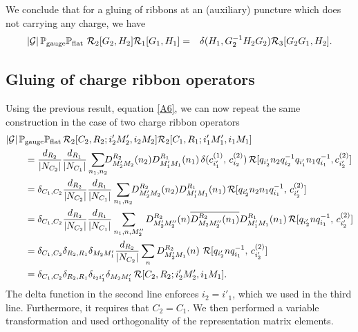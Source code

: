 \documentclass[nofootinbib,superscriptaddress,eqsecnum,tightenlines,11pt]{revtex4-1}
\def\nn{\nonumber}
\def\q{\qquad}
\def\mG{\mathcal{G}}
\def\ba{\begin{eqnarray}}
\def\ea{\end{eqnarray}}
\begin{document}
We conclude that for a gluing of ribbons at an (auxiliary) puncture which does not carrying any charge, we have
\ba\label{A6}
|\mG|\,  {\mathbb P}_\text{gauge}  {\mathbb P}_\text{flat} \,\, {\cal R}_2[G_2,H_2]  {\cal R}_1[G_1,H_1] 
&=& 
\delta(H_1,G_2^{-1} H_2 G_2)  {\cal R}_3[G_2 G_1,H_2]   .
\ea


\subsection{Gluing of charge ribbon operators}\label{GCR}


Using the previous result, equation \eqref{A6}, we can now repeat the same construction in the case of two charge ribbon operators
\begin{align}
	& |{\cal G}|\,{\mathbb P}_\text{gauge} {\mathbb P}_\text{flat} \, {\cal R}_2[C_2,R_2; i'_2M'_2,i_2M_2]   {\cal R}_2[C_1,R_1; i'_1M'_1,i_1M_1]\nn\\
	&\q =  \frac{d_{R_2}}{|N_{C_2}|} \frac{d_{R_1}}{|N_{C_1}|}
	\sum_{n_1,n_2}\!\!\!
	D^{R_2}_{M'_2M_2}(n_2) D^{R_1}_{M_1'M_1}(n_1) \, \delta( c^{(1)}_{i'_1} ,\,c^{(2)}_{i_2}  )\, %
	 {\cal R}[ q_{i'_2}n_2 q^{-1}_{i_2} q_{i'_1} n_1 q^{-1}_{i_1},c^{(2)}_{i'_2}]
	\nn\\
	&\q =
	\delta_{C_1,C_2}\frac{d_{R_2}}{|N_{C_2}|} \frac{d_{R_1}}{|N_{C_1}|} \sum_{n_1,n_2}\!\!
	D^{R_2}_{M'_2M_2}(n_2) D^{R_1}_{M_1'M_1}(n_1) \,
	 {\cal R}[ q_{i'_2}n_2  n_1 q^{-1}_{i_1},\, c^{(2)}_{i'_2}] \nn\\
	 &\q =
	\delta_{C_1,C_2} \frac{d_{R_2}}{|N_{C_2}|} \frac{d_{R_1}}{|N_{C_1}|}
	\sum_{n_1,n,M_2''}
	D^{R_2}_{M'_2M_2''}(n)  \overline{D^{R_2}_{M_2M''_2}(n_1)} D^{R_1}_{M_1'M_1}(n_1) \,
 	{\cal R}[ q_{i'_2}n q^{-1}_{i_1},\, c^{(2)}_{i'_2}]  \nn\\
 	&\q =\delta_{C_1,C_2}  \delta_{R_2,R_1}   \delta_{M_2 M_1'} \frac{d_{R_2}}{|N_{C_2}|}
    	\sum_{n}  D^{R_2}_{M'_2M_1}(n)  \,\,
 	{\cal R}[ q_{i'_2}n q^{-1}_{i_1},\, c^{(2)}_{i'_2}] \nn\\
	 &\q= \delta_{C_1,C_2} \delta_{R_2,R_1} \delta_{i_2 i'_1}  \delta_{M_2 M_1'}  \,   {\cal R}[C_2,R_2; i'_2M'_2,i_1M_1].
\end{align}
The delta function in the second line enforces $i_2=i'_1$, which we used in the third line. Furthermore, it requires that $C_2=C_1$. We then performed a variable transformation and  used orthogonality of the representation matrix elements.
\end{document}
